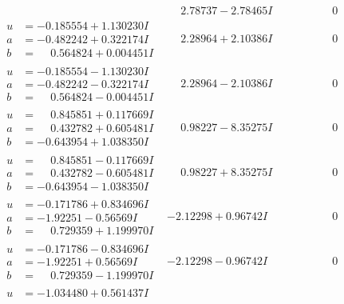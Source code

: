 \documentclass[1p]{elsarticle_modified}
\theoremstyle{definition}
\begin{document}
$$\begin{array}{c|c|c}
 & \phantom{-}2.78737 - 2.78465 I & \phantom{-0.000000 } 0 \\ \hline\begin{aligned}
u &= -0.185554 + 1.130230 I \\
a &= -0.482242 + 0.322174 I \\
b &= \phantom{-}0.564824 + 0.004451 I\end{aligned}
 & \phantom{-}2.28964 + 2.10386 I & \phantom{-0.000000 } 0 \\ \hline\begin{aligned}
u &= -0.185554 - 1.130230 I \\
a &= -0.482242 - 0.322174 I \\
b &= \phantom{-}0.564824 - 0.004451 I\end{aligned}
 & \phantom{-}2.28964 - 2.10386 I & \phantom{-0.000000 } 0 \\ \hline\begin{aligned}
u &= \phantom{-}0.845851 + 0.117669 I \\
a &= \phantom{-}0.432782 + 0.605481 I \\
b &= -0.643954 + 1.038350 I\end{aligned}
 & \phantom{-}0.98227 - 8.35275 I & \phantom{-0.000000 } 0 \\ \hline\begin{aligned}
u &= \phantom{-}0.845851 - 0.117669 I \\
a &= \phantom{-}0.432782 - 0.605481 I \\
b &= -0.643954 - 1.038350 I\end{aligned}
 & \phantom{-}0.98227 + 8.35275 I & \phantom{-0.000000 } 0 \\ \hline\begin{aligned}
u &= -0.171786 + 0.834696 I \\
a &= -1.92251 - 0.56569 I \\
b &= \phantom{-}0.729359 + 1.199970 I\end{aligned}
 & -2.12298 + 0.96742 I & \phantom{-0.000000 } 0 \\ \hline\begin{aligned}
u &= -0.171786 - 0.834696 I \\
a &= -1.92251 + 0.56569 I \\
b &= \phantom{-}0.729359 - 1.199970 I\end{aligned}
 & -2.12298 - 0.96742 I & \phantom{-0.000000 } 0 \\ \hline\begin{aligned}
u &= -1.034480 + 0.561437 I \\

\end{aligned}
\end{array}$$
\end{document}
